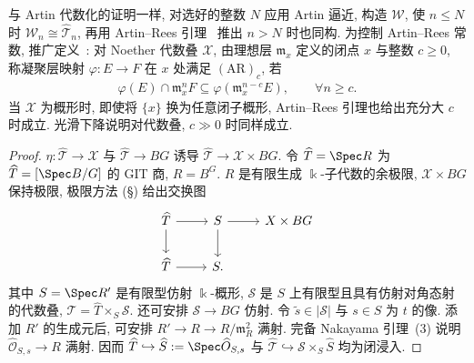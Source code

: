 与 Artin 代数化的证明一样, 对选好的整数 $N$ 应用 Artin 逼近, 构造 $\mathcal W$, 使 $n\le N$ 时 $\mathcal W_n\cong\widehat{\mathcal T}_n$, 再用 Artin--Rees 引理~ 推出 $n>N$ 时也同构. 为控制 Artin--Rees 常数, 推广定义~: 对 Noether 代数叠 $\mathcal X$, 由理想层 $\mathfrak m_x$ 定义的闭点 $x$ 与整数 $c\ge0$, 称凝聚层映射 $\varphi:E\to F$ 在 $x$ 处满足 $(\mathrm{AR})_c$, 若
\begin{align*}
\varphi(E)\cap\mathfrak m_x^nF\subseteq\varphi(\mathfrak m_x^{n-c}E),\qquad\forall n\ge c.
\end{align*}
当 $\mathcal X$ 为概形时, 即使将 $\{x\}$ 换为任意闭子概形, Artin--Rees 引理也给出充分大 $c$ 时成立. 光滑下降说明对代数叠, $c\gg0$ 时同样成立.
\begin{proof}
$\eta:\widehat{\mathcal T}\to\mathcal X$ 与 $\widehat{\mathcal T}\to BG$ 诱导 $\widehat{\mathcal T}\to\mathcal X\times BG$. 令 $\widehat T=\Spec R$ 为 $\widehat{\mathcal T}=[\Spec B/G]$ 的 GIT 商, $R=B^G$. $R$ 是有限生成 $\Bbbk$-子代数的余极限, $\mathcal X\times BG$ 保持极限, 极限方法 (\S{}) 给出交换图
\begin{align*}
\begin{tikzcd}[ampersand replacement=\&]
\widehat{\mathcal T}\arrow[r]\arrow[d]\&\mathcal S\arrow[r]\arrow[d]\&\mathcal X\times BG\\
\widehat T\arrow[r]\&S.\&
\end{tikzcd}
\end{align*}
其中 $S=\Spec R'$ 是有限型仿射 $\Bbbk$-概形, $\mathcal S$ 是 $S$ 上有限型且具有仿射对角态射的代数叠, $\widehat{\mathcal T}=\widehat T\times_S\mathcal S$. 还可安排 $\mathcal S\to BG$ 仿射. 令 $\widetilde s\in|\mathcal S|$ 与 $s\in S$ 为 $t$ 的像. 添加 $R'$ 的生成元后, 可安排 $R'\to R\to R/\mathfrak m_R^2$ 满射. 完备 Nakayama 引理~(3) 说明 $\widehat{\mathcal O}_{S,s}\to R$ 满射. 因而 $\widehat T\hookrightarrow\widehat S:=\Spec\widehat{\mathcal O}_{S,s}$ 与 $\widehat{\mathcal T}\hookrightarrow\mathcal S\times_S\widehat S$ 均为闭浸入.


\end{proof}

